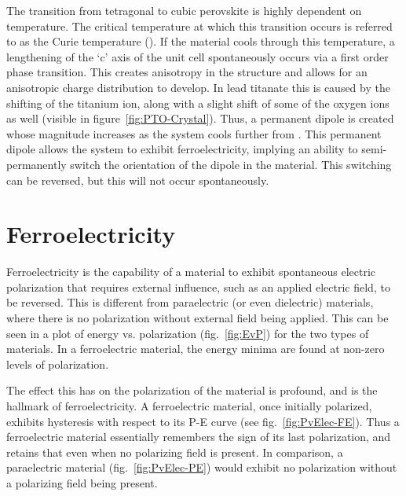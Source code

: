 The transition from tetragonal to cubic perovskite is highly dependent on temperature. The critical temperature at which this transition occurs is referred to as the Curie temperature (\Tc{}). If the material cools through this temperature, a lengthening of the `c' axis of the unit cell spontaneously occurs via a first order phase transition. This creates anisotropy in the structure and allows for an anisotropic charge distribution to develop. In lead titanate this is caused by the shifting of the titanium ion, along with a slight shift of some of the oxygen ions as well (visible in figure~\vref{fig:PTO-Crystal}). Thus, a permanent dipole is created whose magnitude increases as the system cools further from \Tc{}. This permanent dipole allows the system to exhibit ferroelectricity, implying an ability to semi-permanently switch the orientation of the dipole in the material. This switching can be reversed, but this will not occur spontaneously.\cite{pan_abnormal_2001,kolpak_polarization_2007,park_effect_2009,lee_unusual_2010}



\section{Ferroelectricity}
\label{sec:Materials-Ferro}

Ferroelectricity is the capability of a material to exhibit spontaneous electric polarization that requires external influence, such as an applied electric field, to be reversed. This is different from paraelectric (or even dielectric) materials, where there is no polarization without external field being applied. This can be seen in a plot of energy vs. polarization (fig.~\vref{fig:EvP}) for the two types of materials. In a ferroelectric material, the energy minima are found at non-zero levels of polarization.\cite{gonzalo_effective_2006,rabe_modern_2007} 

The effect this has on the polarization of the material is profound, and is the hallmark of ferroelectricity. A ferroelectric material, once initially polarized, exhibits hysteresis with respect to its P-E curve (see fig.~\ref{fig:PvElec-FE}). Thus a ferroelectric material essentially remembers the sign of its last polarization, and retains that even when no polarizing field is present. In comparison, a paraelectric material (fig.~\ref{fig:PvElec-PE}) would exhibit no polarization without a polarizing field being present.\cite{gonzalo_effective_2006,Nonnenmann_2012,rabe_modern_2007,Coster_2011}

